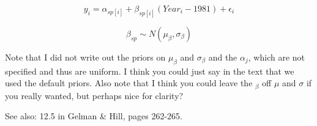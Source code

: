 \documentclass[12pt,a4paper]{article}
\begin{document}
\begin{equation}
y_{i}=\alpha_{sp[i]}+\beta_{sp[i]}(Year_{i}-1981)+\epsilon_{i}
\end{equation}

\begin{equation}
\beta_{sp} \sim N(\mu_{\beta}, \sigma_{\beta})
\end{equation}

\vspace{2ex}

\noindent Note that I did not write out the priors on $\mu_{\beta}$ and $\sigma_{\beta}$ and the $\alpha_{j}$, which are not specified and thus are uniform. I think you could just say in the text that we used the default priors. Also note that I think you could leave the $_{\beta}$ off $\mu$ and $\sigma$ if you really wanted, but perhaps nice for clarity?

\newpage



\noindent See also: 12.5 in Gelman \& Hill, pages 262-265.
\end{document}
